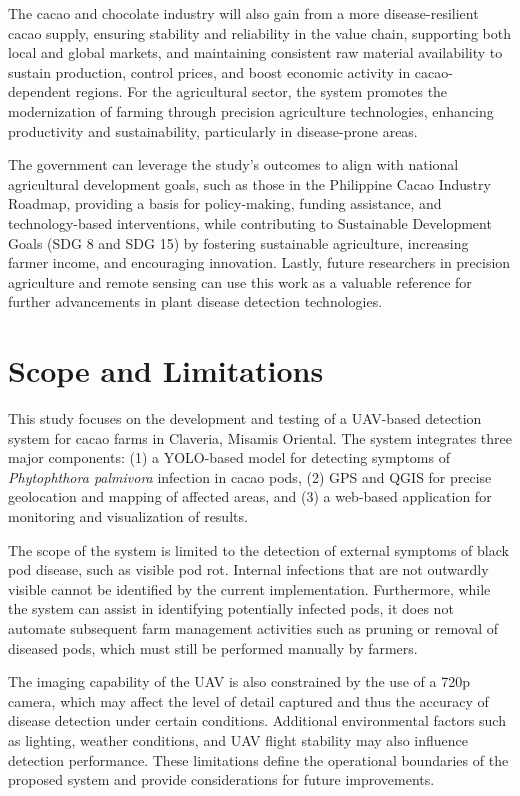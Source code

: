 {The cacao and chocolate industry will also gain from a more disease-resilient cacao supply, ensuring stability and reliability in the value chain, supporting both local and global markets, and maintaining consistent raw material availability to sustain production, control prices, and boost economic activity in cacao-dependent regions. For the agricultural sector, the system promotes the modernization of farming through precision agriculture technologies, enhancing productivity and sustainability, particularly in disease-prone areas.

The government can leverage the study’s outcomes to align with national agricultural development goals, such as those in the Philippine Cacao Industry Roadmap, providing a basis for policy-making, funding assistance, and technology-based interventions, while contributing to Sustainable Development Goals (SDG 8 and SDG 15) by fostering sustainable agriculture, increasing farmer income, and encouraging innovation. Lastly, future researchers in precision agriculture and remote sensing can use this work as a valuable reference for further advancements in plant disease detection technologies.

\section{Scope and Limitations}

This study focuses on the development and testing of a UAV-based detection system for cacao farms in Claveria, Misamis Oriental. The system integrates three major components: (1) a YOLO-based model for detecting symptoms of \textit{Phytophthora palmivora} infection in cacao pods, (2) GPS and QGIS for precise geolocation and mapping of affected areas, and (3) a web-based application for monitoring and visualization of results.

The scope of the system is limited to the detection of external symptoms of black pod disease, such as visible pod rot. Internal infections that are not outwardly visible cannot be identified by the current implementation. Furthermore, while the system can assist in identifying potentially infected pods, it does not automate subsequent farm management activities such as pruning or removal of diseased pods, which must still be performed manually by farmers.

The imaging capability of the UAV is also constrained by the use of a 720p camera, which may affect the level of detail captured and thus the accuracy of disease detection under certain conditions. Additional environmental factors such as lighting, weather conditions, and UAV flight stability may also influence detection performance. These limitations define the operational boundaries of the proposed system and provide considerations for future improvements.

}
